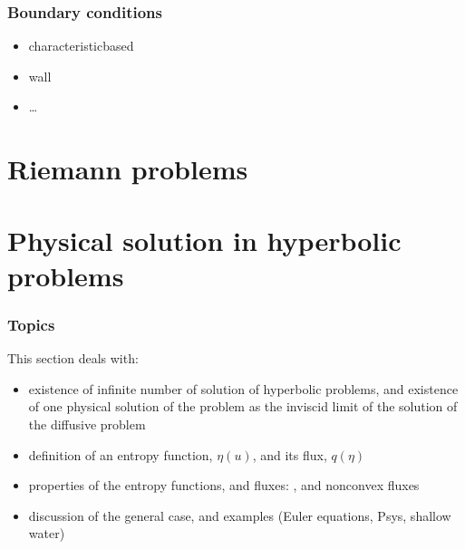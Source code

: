 \documentclass[letterpaper,10pt,english]{jupyterBook}
\begin{document}
\subsubsection{Boundary conditions}
\label{\detokenize{ch/pde/hyperbolic-nd-shallow-water:boundary-conditions}}\label{\detokenize{ch/pde/hyperbolic-nd-shallow-water:pde-hyperbolic-nd-shallow-water-bc}}\begin{itemize}
\item {} 
\sphinxAtStartPar
characteristic\sphinxhyphen{}based

\item {} 
\sphinxAtStartPar
wall

\item {} 
\sphinxAtStartPar
…

\end{itemize}

\sphinxstepscope


\section{Riemann problems}
\label{\detokenize{ch/pde/hyperbolic-riemann-pb:riemann-problems}}\label{\detokenize{ch/pde/hyperbolic-riemann-pb:pde-hyperbolic-riemann-pb}}\label{\detokenize{ch/pde/hyperbolic-riemann-pb::doc}}
\sphinxAtStartPar
{}

\sphinxstepscope


\section{Physical solution in hyperbolic problems}
\label{\detokenize{ch/pde/hyperbolic-entropy:physical-solution-in-hyperbolic-problems}}\label{\detokenize{ch/pde/hyperbolic-entropy:pde-hyperbolic-entropy}}\label{\detokenize{ch/pde/hyperbolic-entropy::doc}}\subsubsection*{Topics}

\sphinxAtStartPar
This section deals with:
\begin{itemize}
\item {} 
\sphinxAtStartPar
existence of infinite number of solution of hyperbolic problems, and existence of one physical solution of the problem as the inviscid limit of the solution of the diffusive problem

\item {} 
\sphinxAtStartPar
definition of an entropy function, \(\eta(u)\), and its flux, \(q(\eta)\)

\item {} 
\sphinxAtStartPar
properties of the entropy functions, and fluxes: , and non\sphinxhyphen{}convex fluxes

\item {} 
\sphinxAtStartPar
discussion of the general case, and examples (Euler equations, P\sphinxhyphen{}sys, shallow water)

\end{itemize}
\end{document}
